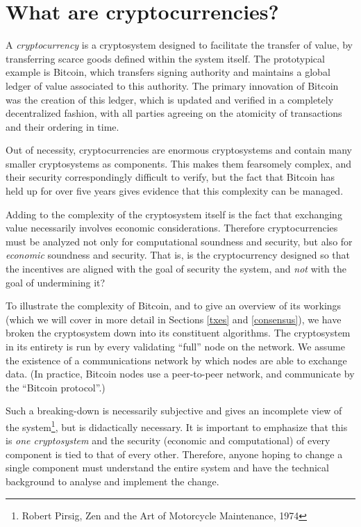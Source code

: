 \documentclass[letterpaper]{article}
\begin{document}
\section{What are cryptocurrencies?}

A \emph{cryptocurrency} is a cryptosystem designed to facilitate the transfer
of value, by transferring scarce goods defined within the system itself. The
prototypical example is Bitcoin, which transfers signing authority and maintains
a global ledger of value associated to this authority. The primary innovation
of Bitcoin was the creation of this ledger, which is updated and verified in
a completely decentralized fashion, with all parties agreeing on the atomicity
of transactions and their ordering in time.

Out of necessity, cryptocurrencies are enormous cryptosystems and contain many
smaller cryptosystems as components. This makes them fearsomely complex, and
their security correspondingly difficult to verify, but the fact that Bitcoin
has held up for over five years gives evidence that this complexity can be
managed.

Adding to the complexity of the cryptosystem itself is the fact that exchanging
value necessarily involves economic considerations. Therefore cryptocurrencies
must be analyzed not only for computational soundness and security, but also
for \emph{economic} soundness and security. That is, is the cryptocurrency
designed so that the incentives are aligned with the goal of security the system,
and \emph{not} with the goal of undermining it?

To illustrate the complexity of Bitcoin, and to give an overview of its
workings (which we will cover in more detail in Sections \ref{txes} and
\ref{consensus}), we have broken the cryptosystem
down into its constituent algorithms. The cryptosystem in its entirety is
run by every validating ``full'' node on the network. We assume the existence
of a communications network by which nodes are able to exchange data. (In
practice, Bitcoin nodes use a peer-to-peer network, and communicate by the
``Bitcoin protocol''.)

Such a breaking-down is necessarily subjective and gives an incomplete view
of the system\footnote{Robert Pirsig, Zen and the Art of Motorcycle Maintenance,
1974}, but is didactically necessary.
It is important to emphasize that this is \emph{one cryptosystem} and the
security (economic and computational) of every component is tied to that
of every other. Therefore, anyone hoping to change a single component must
understand the entire system and have the technical background to analyse
and implement the change.
\end{document}
